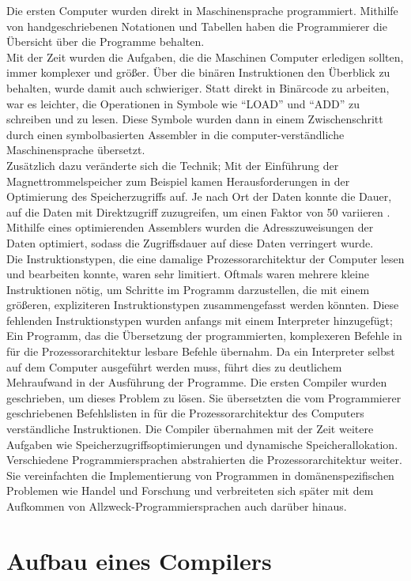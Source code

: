 Die ersten Computer wurden direkt in Maschinensprache programmiert.
Mithilfe von handgeschriebenen Notationen und Tabellen haben die Programmierer die Übersicht über
die Programme behalten.\\
Mit der Zeit wurden die Aufgaben, die die Maschinen Computer erledigen sollten, immer komplexer und größer.
Über die binären Instruktionen den Überblick zu behalten, wurde damit auch schwieriger.
Statt direkt in Binärcode zu arbeiten, war es leichter, die Operationen in Symbole wie ``LOAD'' und ``ADD'' zu schreiben und zu lesen.
Diese Symbole wurden dann in einem Zwischenschritt durch einen symbolbasierten Assembler in die computer-verständliche Maschinensprache übersetzt.\\
Zusätzlich dazu veränderte sich die Technik; 
Mit der Einführung der Magnettrommelspeicher zum Beispiel kamen Herausforderungen in der Optimierung des Speicherzugriffs auf.
Je nach Ort der Daten konnte die Dauer, auf die Daten mit Direktzugriff zuzugreifen, um einen Faktor von 50 variieren \cite{calingaert:1979}.
Mithilfe eines optimierenden Assemblers wurden die Adresszuweisungen der Daten optimiert, sodass die Zugriffsdauer auf diese Daten verringert wurde.\\
Die Instruktionstypen, die eine damalige Prozessorarchitektur der Computer lesen und bearbeiten konnte, waren sehr limitiert.
Oftmals waren mehrere kleine Instruktionen nötig, um Schritte im Programm darzustellen, die mit einem größeren, expliziteren Instruktionstypen
zusammengefasst werden könnten.
Diese fehlenden Instruktionstypen wurden anfangs mit einem Interpreter hinzugefügt; Ein Programm, das die Übersetzung der programmierten, komplexeren Befehle
in für die Prozessorarchitektur lesbare Befehle übernahm.
Da ein Interpreter selbst auf dem Computer ausgeführt werden muss, führt dies zu deutlichem Mehraufwand in der Ausführung der Programme.
Die ersten Compiler wurden geschrieben, um dieses Problem zu lösen.
Sie übersetzten die vom Programmierer geschriebenen Befehlslisten in für die Prozessorarchitektur des Computers verständliche Instruktionen.
Die Compiler übernahmen mit der Zeit weitere Aufgaben wie Speicherzugriffsoptimierungen und dynamische Speicherallokation.
Verschiedene Programmiersprachen abstrahierten die Prozessorarchitektur weiter.
Sie vereinfachten die Implementierung von Programmen in domänenspezifischen Problemen wie Handel und Forschung und verbreiteten sich später mit dem Aufkommen von Allzweck-Programmiersprachen auch darüber hinaus\cite{calingaert:1979}.

\section{Aufbau eines Compilers}

